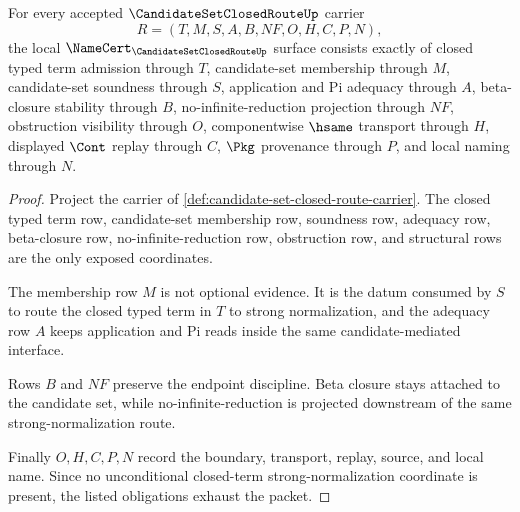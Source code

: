 \begin{theorem}
\label{thm:candidate-set-closed-route-namecert-obligations}
For every accepted $\CandidateSetClosedRouteUp$ carrier
$$
R=(T,M,S,A,B,NF,O,H,C,P,N),
$$
the local $\NameCert_{\CandidateSetClosedRouteUp}$ surface consists exactly of closed typed term admission through $T$, candidate-set membership through $M$, candidate-set soundness through $S$, application and Pi adequacy through $A$, beta-closure stability through $B$, no-infinite-reduction projection through $NF$, obstruction visibility through $O$, componentwise $\hsame$ transport through $H$, displayed $\Cont$ replay through $C$, $\Pkg$ provenance through $P$, and local naming through $N$.
\end{theorem}
\begin{proof}
Project the carrier of \autoref{def:candidate-set-closed-route-carrier}. The closed typed term row, candidate-set membership row, soundness row, adequacy row, beta-closure row, no-infinite-reduction row, obstruction row, and structural rows are the only exposed coordinates.

The membership row $M$ is not optional evidence. It is the datum consumed by $S$ to route the closed typed term in $T$ to strong normalization, and the adequacy row $A$ keeps application and Pi reads inside the same candidate-mediated interface.

Rows $B$ and $NF$ preserve the endpoint discipline. Beta closure stays attached to the candidate set, while no-infinite-reduction is projected downstream of the same strong-normalization route.

Finally $O,H,C,P,N$ record the boundary, transport, replay, source, and local name. Since no unconditional closed-term strong-normalization coordinate is present, the listed obligations exhaust the packet.
\end{proof}

